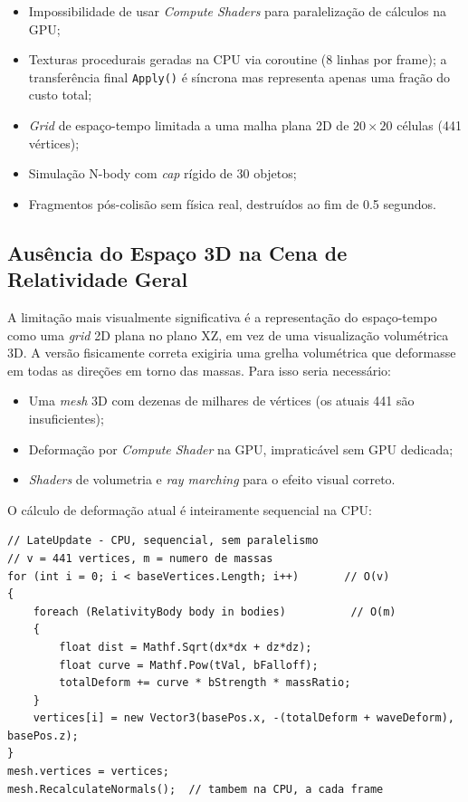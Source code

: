\documentclass[12pt,a4paper]{article}
\begin{document}
\begin{itemize}
  \item Impossibilidade de usar \textit{Compute Shaders} para paraleliza\c{c}\~{a}o de c\'{a}lculos na GPU;
  \item Texturas procedurais geradas na CPU via coroutine (8 linhas por frame); a transfer\^{e}ncia final \texttt{Apply()} \'{e} s\'{i}ncrona mas representa apenas uma fra\c{c}\~{a}o do custo total;
  \item \textit{Grid} de espa\c{c}o-tempo limitada a uma malha plana 2D de $20 \times 20$ c\'{e}lulas (441 v\'{e}rtices);
  \item Simula\c{c}\~{a}o N-body com \textit{cap} r\'{i}gido de 30 objetos;
  \item Fragmentos p\'{o}s-colis\~{a}o sem f\'{i}sica real, destru\'{i}dos ao fim de 0.5 segundos.
\end{itemize}

\subsection{Aus\^{e}ncia do Espa\c{c}o 3D na Cena de Relatividade Geral}

A limita\c{c}\~{a}o mais visualmente significativa \'{e} a representa\c{c}\~{a}o do espa\c{c}o-tempo como uma \textit{grid} 2D plana no plano XZ, em vez de uma visualiza\c{c}\~{a}o volum\'{e}trica 3D. A vers\~{a}o fisicamente correta exigiria uma grelha volum\'{e}trica que deformasse em todas as dire\c{c}\~{o}es em torno das massas. Para isso seria necess\'{a}rio:

\begin{itemize}
  \item Uma \textit{mesh} 3D com dezenas de milhares de v\'{e}rtices (os atuais 441 s\~{a}o insuficientes);
  \item Deforma\c{c}\~{a}o por \textit{Compute Shader} na GPU, impratic\'{a}vel sem GPU dedicada;
  \item \textit{Shaders} de volumetria e \textit{ray marching} para o efeito visual correto.
\end{itemize}

O c\'{a}lculo de deforma\c{c}\~{a}o atual \'{e} inteiramente sequencial na CPU:

\begin{lstlisting}[caption={SpacetimeGrid.cs - loop de deforma\c{c}\~{a}o na CPU, O(v $\times$ m) por frame}]
// LateUpdate - CPU, sequencial, sem paralelismo
// v = 441 vertices, m = numero de massas
for (int i = 0; i < baseVertices.Length; i++)       // O(v)
{
    foreach (RelativityBody body in bodies)          // O(m)
    {
        float dist = Mathf.Sqrt(dx*dx + dz*dz);
        float curve = Mathf.Pow(tVal, bFalloff);
        totalDeform += curve * bStrength * massRatio;
    }
    vertices[i] = new Vector3(basePos.x, -(totalDeform + waveDeform), basePos.z);
}
mesh.vertices = vertices;
mesh.RecalculateNormals();  // tambem na CPU, a cada frame
\end{lstlisting}
\end{document}

